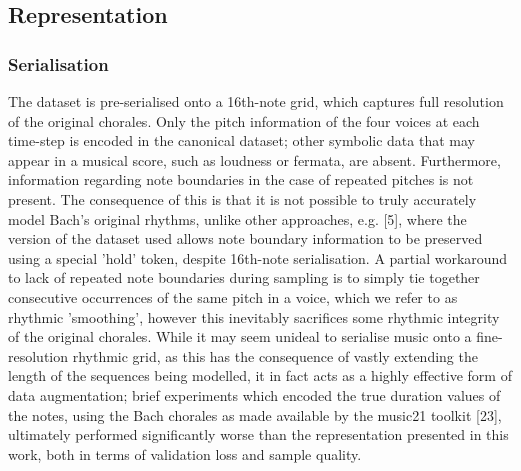 \documentclass{article}
\begin{document}
\subsection{Representation}\label{subsec:representation}

\subsubsection{Serialisation}

The dataset is pre-serialised onto a 16th-note grid, which captures full resolution of the original chorales. Only the pitch information of the four voices at each time-step is encoded in the canonical dataset; other symbolic data that may appear in a musical score, such as loudness or fermata, are absent. Furthermore, information regarding note boundaries in the case of repeated pitches is not present. The consequence of this is that it is not possible to truly accurately model Bach's original rhythms, unlike other approaches, e.g. [5], where the version of the dataset used allows note boundary information to be preserved using a special 'hold' token, despite 16th-note serialisation. A partial workaround to lack of repeated note boundaries during sampling is to simply tie together consecutive occurrences of the same pitch in a voice, which we refer to as rhythmic 'smoothing', however this inevitably sacrifices some rhythmic integrity of the original chorales. While it may seem unideal to serialise music onto a fine-resolution rhythmic grid, as this has the consequence of vastly extending the length of the sequences being modelled, it in fact acts as a highly effective form of data augmentation; brief experiments which encoded the true duration values of the notes, using the Bach chorales as made available by the music21 toolkit [23], ultimately performed significantly worse than the representation presented in this work, both in terms of validation loss and sample quality.
\end{document}
